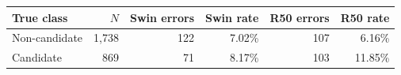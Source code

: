\begin{tabular}{lrrrrr}
\toprule
True class & $N$ & Swin errors & Swin rate & R50 errors & R50 rate\\
\midrule
Non-candidate & 1,738 & 122 & 7.02\% & 107 & 6.16\%\\
Candidate & 869 & 71 & 8.17\% & 103 & 11.85\%\\
\bottomrule
\end{tabular}